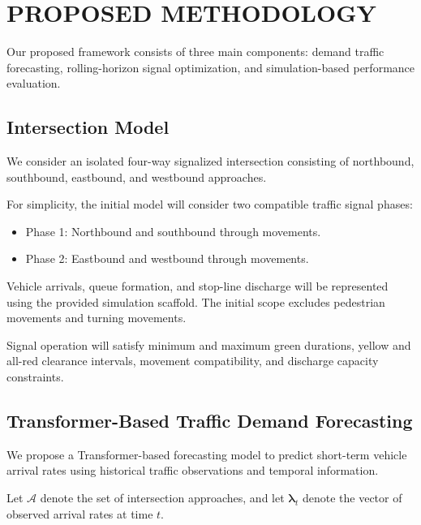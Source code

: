 \documentclass[letterpaper,12pt,conference]{ieeeconf}
\begin{document}
\section{PROPOSED METHODOLOGY}

Our proposed framework consists of three main components:
demand traffic forecasting, rolling-horizon signal
optimization, and simulation-based performance evaluation.

\subsection{Intersection Model}

We consider an isolated four-way signalized intersection
consisting of northbound, southbound, eastbound, and
westbound approaches.

For simplicity, the initial model will consider two
compatible traffic signal phases:

\begin{itemize}
    \item Phase 1: Northbound and southbound through movements.
    \item Phase 2: Eastbound and westbound through movements.
\end{itemize}

Vehicle arrivals, queue formation, and stop-line discharge
will be represented using the provided simulation scaffold.
The initial scope excludes pedestrian movements and turning
movements.

Signal operation will satisfy minimum and maximum green
durations, yellow and all-red clearance intervals,
movement compatibility, and discharge capacity constraints.







\subsection{Transformer-Based Traffic Demand Forecasting}

We propose a Transformer-based forecasting model to
predict short-term vehicle arrival rates using historical
traffic observations and temporal information.

Let $\mathcal{A}$ denote the set of intersection
approaches, and let $\boldsymbol{\lambda}_t$ denote
the vector of observed arrival rates at time $t$.
\end{document}
